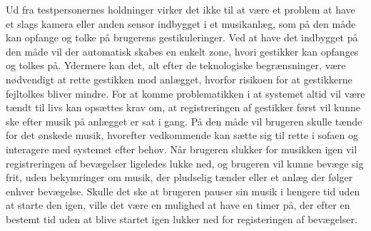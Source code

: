 Ud fra testpersonernes holdninger virker det ikke til at være et problem at have et slags kamera eller anden sensor indbygget i et musikanlæg, som på den måde kan opfange og tolke på brugerens gestikuleringer. Ved at have det indbygget på den måde vil der automatisk skabes en enkelt zone, hvori gestikker kan opfanges og tolkes på. Ydermere kan det, alt efter de teknologiske begrænsninger, være nødvendigt at rette gestikken mod anlægget, hvorfor risikoen for at gestikkerne fejltolkes bliver mindre. For at komme problematikken i at systemet altid vil være tændt til livs kan opsættes krav om, at registreringen af gestikker først vil kunne ske efter musik på anlægget er sat i gang. På den måde vil brugeren skulle tænde for det ønskede musik, hvorefter vedkommende kan sætte sig til rette i sofaen og interagere med systemet efter behov. Når brugeren slukker for musikken igen vil registreringen af bevægelser ligeledes lukke ned, og brugeren vil kunne bevæge sig frit, uden bekymringer om musik, der pludselig tænder eller et anlæg der følger enhver bevægelse. Skulle det ske at brugeren pauser sin musik i længere tid uden at starte den igen, ville det være en mulighed at have en timer på, der efter en bestemt tid uden at blive startet igen lukker ned for registeringen af bevægelser.  
